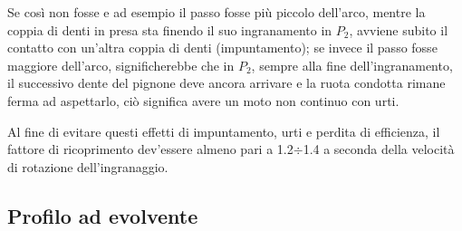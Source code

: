 \documentclass[a4paper, 15pt]{article}
\begin{document}
\begin{adjustwidth}{2in}{}
		Se così non fosse e ad esempio il passo fosse più piccolo dell'arco, mentre la coppia di denti in presa sta finendo il suo ingranamento in $P_2$, avviene subito il contatto con un'altra coppia di denti (impuntamento); se invece il passo fosse maggiore dell'arco, significherebbe che in $P_2$, sempre alla fine dell'ingranamento, il successivo dente del pignone deve ancora arrivare e la ruota condotta rimane ferma ad aspettarlo, ciò significa avere un moto non continuo con urti. \newline
		
		Al fine di evitare questi effetti di impuntamento, urti e perdita di efficienza, il fattore di ricoprimento dev'essere almeno pari a 1.2$\div$1.4 a seconda della velocità di rotazione dell'ingranaggio. 
	\end{adjustwidth}
\newpage	
	\subsection{Profilo ad evolvente}
\end{document}
